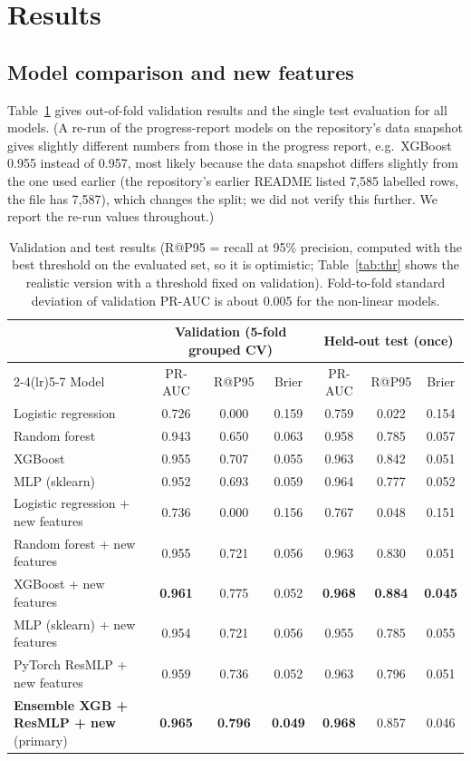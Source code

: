 \documentclass[11pt,a4paper]{article}
\begin{document}
\section{Results}
\subsection{Model comparison and new features}
Table~\ref{tab:main} gives out-of-fold validation results and the single test evaluation for all models. (A re-run of the progress-report models on the repository's data snapshot gives slightly different numbers from those in the progress report, e.g.\ XGBoost 0.955 instead of 0.957, most likely because the data snapshot differs slightly from the one used earlier (the repository's earlier README listed 7,585 labelled rows, the file has 7,587), which changes the split; we did not verify this further. We report the re-run values throughout.)

\begin{table}[H]\centering\footnotesize\setlength{\tabcolsep}{3.5pt}
\begin{tabular}{@{}lcccccc@{}}\toprule
 & \multicolumn{3}{c}{Validation (5-fold grouped CV)} & \multicolumn{3}{c}{Held-out test (once)}\\\cmidrule(lr){2-4}\cmidrule(lr){5-7}
Model & PR-AUC & R@P95 & Brier & PR-AUC & R@P95 & Brier\\\midrule
Logistic regression & 0.726 & 0.000 & 0.159 & 0.759 & 0.022 & 0.154\\
Random forest & 0.943 & 0.650 & 0.063 & 0.958 & 0.785 & 0.057\\
XGBoost & 0.955 & 0.707 & 0.055 & 0.963 & 0.842 & 0.051\\
MLP (sklearn) & 0.952 & 0.693 & 0.059 & 0.964 & 0.777 & 0.052\\\midrule
Logistic regression + new features & 0.736 & 0.000 & 0.156 & 0.767 & 0.048 & 0.151\\
Random forest + new features & 0.955 & 0.721 & 0.056 & 0.963 & 0.830 & 0.051\\
XGBoost + new features & \textbf{0.961} & 0.775 & 0.052 & \textbf{0.968} & \textbf{0.884} & \textbf{0.045}\\
MLP (sklearn) + new features & 0.954 & 0.721 & 0.056 & 0.955 & 0.785 & 0.055\\
PyTorch ResMLP + new features & 0.959 & 0.736 & 0.052 & 0.963 & 0.796 & 0.051\\
\textbf{Ensemble XGB + ResMLP + new} (primary) & \textbf{0.965} & \textbf{0.796} & \textbf{0.049} & \textbf{0.968} & 0.857 & 0.046\\\bottomrule
\end{tabular}
\caption{Validation and test results (R@P95 = recall at 95\% precision, computed with the best threshold on the evaluated set, so it is optimistic; Table~\ref{tab:thr} shows the realistic version with a threshold fixed on validation). Fold-to-fold standard deviation of validation PR-AUC is about 0.005 for the non-linear models.}\label{tab:main}
\end{table}
\end{document}
